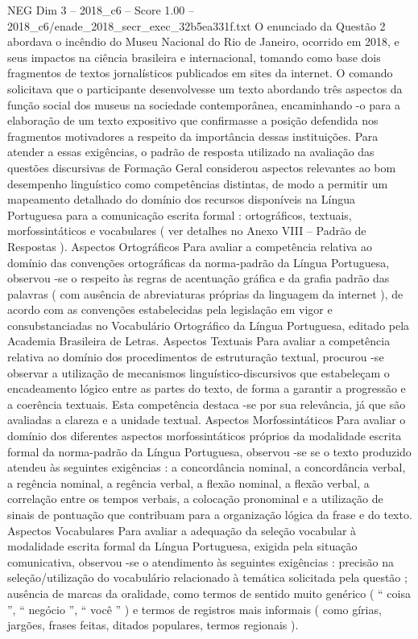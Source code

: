 \begin{textsample}{NEG Dim 3 – 2018\_c6 – Score 1.00 – 2018\_c6/enade\_2018\_secr\_exec\_32b5ea331f.txt}
O enunciado da Questão 2 abordava o incêndio do Museu Nacional do Rio de Janeiro, ocorrido em 2018, e seus impactos na ciência brasileira e internacional, tomando como base dois fragmentos de textos jornalísticos publicados em sites da internet.
O comando solicitava que o participante desenvolvesse um texto abordando três aspectos da função social dos museus na sociedade contemporânea, encaminhando -o para a elaboração de um texto expositivo que confirmasse a posição defendida nos fragmentos motivadores a respeito da importância dessas instituições.
Para atender a essas exigências, o padrão de resposta utilizado na avaliação das questões discursivas de Formação Geral considerou aspectos relevantes ao bom desempenho linguístico como competências distintas, de modo a permitir um mapeamento detalhado do domínio dos recursos disponíveis na Língua Portuguesa para a comunicação escrita formal : ortográficos, textuais, morfossintáticos e vocabulares ( ver detalhes no Anexo VIII – Padrão de Respostas ).
Aspectos Ortográficos Para avaliar a competência relativa ao domínio das convenções ortográficas da norma-padrão da Língua Portuguesa, observou -se o respeito às regras de acentuação gráfica e da grafia padrão das palavras ( com ausência de abreviaturas próprias da linguagem da internet ), de acordo com as convenções estabelecidas pela legislação em vigor e consubstanciadas no Vocabulário Ortográfico da Língua Portuguesa, editado pela Academia Brasileira de Letras.
Aspectos Textuais Para avaliar a competência relativa ao domínio dos procedimentos de estruturação textual, procurou -se observar a utilização de mecanismos linguístico-discursivos que estabeleçam o encadeamento lógico entre as partes do texto, de forma a garantir a progressão e a coerência textuais.
Esta competência destaca -se por sua relevância, já que são avaliadas a clareza e a unidade textual.
Aspectos Morfossintáticos Para avaliar o domínio dos diferentes aspectos morfossintáticos próprios da modalidade escrita formal da norma-padrão da Língua Portuguesa, observou -se se o texto produzido atendeu às seguintes exigências : a concordância nominal, a concordância verbal, a regência nominal, a regência verbal, a flexão nominal, a flexão verbal, a correlação entre os tempos verbais, a colocação pronominal e a utilização de sinais de pontuação que contribuam para a organização lógica da frase e do texto.
Aspectos Vocabulares Para avaliar a adequação da seleção vocabular à modalidade escrita formal da Língua Portuguesa, exigida pela situação comunicativa, observou -se o atendimento às seguintes exigências : precisão na seleção/utilização do vocabulário relacionado à temática solicitada pela questão ; ausência de marcas da oralidade, como termos de sentido muito genérico ( “ coisa ”, “ negócio ”, “ você ” ) e termos de registros mais informais ( como gírias, jargões, frases feitas, ditados populares, termos regionais ).

\end{textsample}
